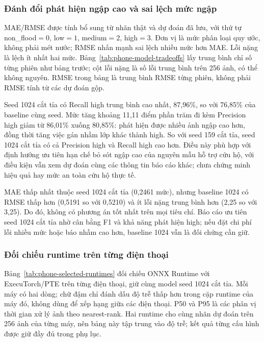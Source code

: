 \subsubsection{Đánh đổi phát hiện ngập cao và sai lệch mức ngập}
MAE/RMSE được tính bổ sung từ nhãn thật và dự đoán đã lưu, với thứ tự non\_flood$=0$, low$=1$, medium$=2$, high$=3$. Đơn vị là mức phân loại quy ước, không phải mét nước; RMSE nhấn mạnh sai lệch nhiều mức hơn MAE. Lỗi nặng là lệch ít nhất hai mức. Bảng~\ref{tab:phone-model-tradeoffs} lấy trung bình chỉ số từng phiên như bảng trước; cột lỗi nặng là số lỗi trung bình trên 256 ảnh, có thể không nguyên. RMSE trong bảng là trung bình RMSE từng phiên, không phải RMSE tính từ các dự đoán gộp.



Seed 1024 cắt tỉa có Recall high trung bình cao nhất, 87,96\%, so với 76,85\% của baseline cùng seed. Mức tăng khoảng 11,11 điểm phần trăm đi kèm Precision high giảm từ 86,01\% xuống 80,85\%: phát hiện được nhiều ảnh ngập cao hơn, đồng thời tăng việc gán nhầm lớp khác thành high. So với seed 159 cắt tỉa, seed 1024 cắt tỉa có cả Precision high và Recall high cao hơn. Điều này phù hợp với định hướng ưu tiên hạn chế bỏ sót ngập cao của nguyên mẫu hỗ trợ cứu hộ, với điều kiện vẫn xem dự đoán cùng các thông tin báo cáo khác; chưa chứng minh hiệu quả hay mức an toàn cứu hộ thực tế.

MAE thấp nhất thuộc seed 1024 cắt tỉa (0,2461 mức), nhưng baseline 1024 có RMSE thấp hơn (0,5191 so với 0,5210) và ít lỗi nặng trung bình hơn (2,25 so với 3,25). Do đó, không có phương án tốt nhất trên mọi tiêu chí. Báo cáo ưu tiên seed 1024 cắt tỉa nhờ cân bằng F1 và khả năng phát hiện high; nếu đặt chi phí lỗi nhiều mức hoặc báo nhầm cao hơn, baseline 1024 vẫn là đối chứng cần giữ.

\subsubsection{Đối chiếu runtime trên từng điện thoại}
Bảng~\ref{tab:phone-selected-runtimes} đối chiếu ONNX Runtime với ExecuTorch/PTE trên từng điện thoại, giữ cùng model seed 1024 cắt tỉa. Mỗi máy có hai dòng; chữ đậm chỉ đánh dấu độ trễ thấp hơn trong cặp runtime của máy đó, không dùng để xếp hạng giữa các điện thoại. P50 và P95 là các phân vị thời gian xử lý ảnh theo nearest-rank. Hai runtime cho cùng nhãn dự đoán trên 256 ảnh của từng máy, nên bảng này tập trung vào độ trễ; kết quả từng cấu hình được giữ đầy đủ trong phụ lục.

